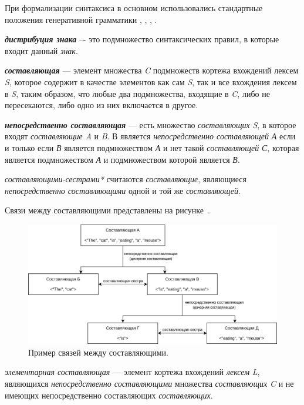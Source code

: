 При формализации синтаксиса в основном использовались стандартные положения генеративной грамматики , , , .

\textit{\textbf{дистрибуция знака}} –- это подмножество синтаксических правил, в которые входит данный \textit{знак}.

\textit{\textbf{составляющая}} --- элемент множества \textit{C} подмножеств кортежа вхождений лексем \textit{S}, которое содержит в качестве элементов как сам \textit{S}, так и все вхождения лексем в \textit{S}, таким образом, что любые два подмножества, входящие в \textit{C}, либо не пересекаются, либо одно из них включается в другое.

\textit{\textbf{непосредственно составляющая}} ---  есть множество \textit{составляющих} \textit{S}, в которое входят \textit{составляющие} \textit{A} и \textit{B}. В является \textit{непосредственно составляющей} \textit{А} если и только если \textit{В} является подмножеством \textit{А} и нет такой \textit{составляющей} \textit{С}, которая является подмножеством \textit{А} и подмножеством которой является \textit{В}.

\textit{составляющими-сестрами*} считаются \textit{составляющие}, являющиеся \textit{непосредственно составляющими} одной и той же \textit{составляющей}.

Связи между составляющими представлены на рисунке~\textit{}.

\begin{figure}[h]
    \centering
    \includegraphics[scale=0.25]{images/part2/chapter_lang/syntactic_example}
    \caption{Пример связей между составляющими.}
    \label{fig:syntactic_example}
\end{figure}

\textit{элементарная составляющая} --- элемент кортежа вхождений \textit{лексем} \textit{L}, являющихся \textit{непосредственно составляющими} множества \textit{составляющих} \textit{C} и не имеющих непосредственно составляющих \textit{составляющих}.

